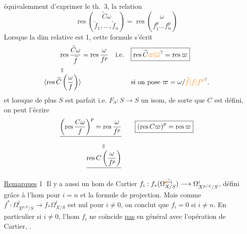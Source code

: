  équivalemment d'exprimer le th.~3, la relation
\[
\boxed{\operatorname{res}\binom{\widetilde C\omega}{\widetilde f_1,\ldots,\widetilde f_n}
 =\operatorname{res}\binom{\omega}{f_1^p\ldots f_n^p}}
\]
Lorsque la dim relative est 1, cette formule s'écrit
\[
\begin{aligned}
\operatorname{res}\frac{\widetilde C\omega}{\widetilde f}
 &=\operatorname{res}\frac{\omega}{f^p}
 &\text{i.e.}\quad &\boxed{\operatorname{res}\widetilde C\unsure{\varpi|\overline\omega}=\operatorname{res}\varpi}\\
\overset{\rotatebox{90}{$=$}}{\inserted{\operatorname{res}\widetilde C\left(\frac{\omega}{f}\right)}}
 &&&\text{si on pose }\varpi=\omega/\unsure{\widetilde f|f|f^p}.
\end{aligned}
\]
et lorsque de plus $S$ est parfait i.e. $F_S:S\longrightarrow S$ un isom, de sorte que $C$ est défini, on peut l'écrire
\[
\begin{aligned}
\deleted{\left(\operatorname{res}\frac{C\omega}{f}\right)^p=\operatorname{res}\frac{\omega}{f^p}}
 &\qquad \boxed{\left(\operatorname{res} C\varpi\right)^p=\operatorname{res}\varpi}\\
\deleted{\overset{\rotatebox{90}{$=$}}{\operatorname{res} C\left(\frac{\omega}{f^p}\right)}}&
\end{aligned}
\]

\uline{Remarques} \textcircled{1} Il y a aussi un hom de Cartier $f_i:f_*(\Omega^{\deleted{\unsure{k}}i}_{X/S})\longrightarrow\Omega^i_{X^{p/S}/S}$, défini grâce à l'hom  pour $i=n$ et la formule de projection. Mais comme $f^\ast:\Omega^i_{X^{p/S}/S}\longrightarrow f_*\Omega^i_{X/S}$ est nul pour $i\ne0$, on conclut que $f_i=0$ si $i\ne n$. En particulier si $i\ne0$, l'hom $f_i$ ne coïncide \uline{pas} en général avec l'opération de Cartier, .

